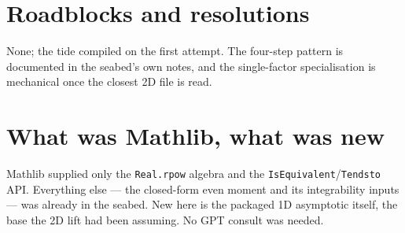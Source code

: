 \documentclass[11pt]{article}
\begin{document}
\section{Roadblocks and resolutions}
None; the tide compiled on the first attempt. The four-step pattern is documented in the seabed's
own notes, and the single-factor specialisation is mechanical once the closest 2D file is read.
\section{What was Mathlib, what was new}
Mathlib supplied only the \texttt{Real.rpow} algebra and the \texttt{IsEquivalent}/\texttt{Tendsto}
API. Everything else --- the closed-form even moment and its integrability inputs --- was already in
the seabed. New here is the packaged 1D asymptotic itself, the base the 2D lift had been assuming.
No GPT consult was needed.
\end{document}
